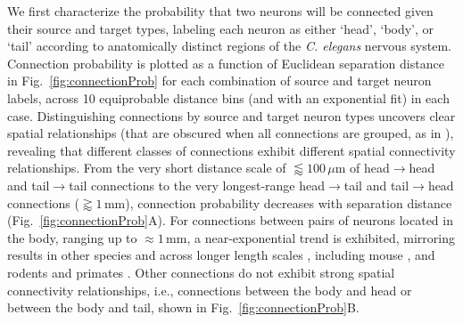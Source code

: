 \documentclass[10pt,letterpaper]{article}
\begin{document}
We first characterize the probability that two neurons will be connected given their source and target types, labeling each neuron as either `head', `body', or `tail' according to anatomically distinct regions of the \emph{C. elegans} nervous system.
Connection probability is plotted as a function of Euclidean separation distance in Fig.~\ref{fig:connectionProb} for each combination of source and target neuron labels, across 10 equiprobable distance bins (and with an exponential fit) in each case.
Distinguishing connections by source and target neuron types uncovers clear spatial relationships (that are obscured when all connections are grouped, as in \cite{Azulay:2016cg}), revealing that different classes of connections exhibit different spatial connectivity relationships.
From the very short distance scale of $\lessapprox 100\,\mu$m of head$\rightarrow$head and tail$\rightarrow$tail connections to the very longest-range head$\rightarrow$tail and tail$\rightarrow$head connections ($\gtrapprox 1\,$mm), connection probability decreases with separation distance (Fig.~\ref{fig:connectionProb}A).
For connections between pairs of neurons located in the body, ranging up to $\approx 1$\,mm, a near-exponential trend is exhibited, mirroring results in other species and across longer length scales \cite{Wang:2016gg}, including mouse \cite{Goulas:2016hr, Fulcher:2016ck}, and rodents and primates \cite{Horvat:2016ia}.
Other connections do not exhibit strong spatial connectivity relationships, i.e., connections between the body and head or between the body and tail, shown in Fig.~\ref{fig:connectionProb}B.
\end{document}
